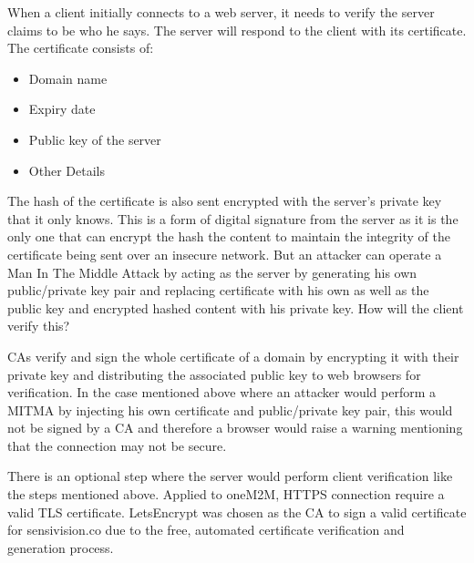 When a client initially connects to a web server, it needs to verify the server claims to be who he says. The server will respond to the client with its certificate. The certificate consists of:

\begin{itemize}
  \item Domain name
  \item Expiry date
  \item Public key of the server
  \item Other Details
\end{itemize}

The hash of the certificate is also sent encrypted with the server’s private key that it only knows. This is a form of digital signature from the server as it is the only one that can encrypt the hash the content to maintain the integrity of the certificate being sent over an insecure network. But an attacker can operate a Man In The Middle Attack by acting as the server by generating his own public/private key pair and replacing certificate with his own as well as the public key and encrypted hashed content with his private key. How will the client verify this? 
 
CAs verify and sign the whole certificate of a domain by encrypting it with their private key and distributing the associated public key to web browsers for verification. In the case mentioned above where an attacker would perform a MITMA by injecting his own certificate and public/private key pair, this would not be signed by a CA and therefore a browser would raise a warning mentioning that the connection may not be secure.

There is an optional step where the server would perform client verification like the steps mentioned above. Applied to oneM2M, HTTPS connection require a valid TLS certificate. LetsEncrypt was chosen as the CA to sign a valid certificate for sensivision.co due to the free, automated certificate verification and generation process.

\clearpage
